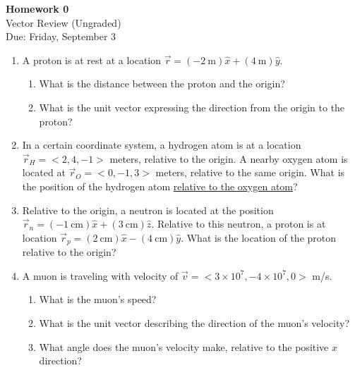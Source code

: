 \documentclass{article}
\begin{document}
\fancyfoot[C]{\thepage}
\vspace*{0cm}
\begin{center}
	{\LARGE \textbf{Homework 0}}\\
	\vspace{0.25cm}
	{\Large Vector Review (Ungraded)}\\
	\vspace{0.25cm}
	{\Large Due: Friday, September 3}
\end{center}

\begin{enumerate}
	\item A proton is at rest at a location $\vec{r}=(-2\ \mathrm{m})\hat{x} + (4\ \mathrm{m})\hat{y}$. 
	\begin{enumerate}
		\item What is the distance between the proton and the origin?
		\item What is the unit vector expressing the direction from the origin to the proton?
	\end{enumerate}

	\item In a certain coordinate system, a hydrogen atom is at a location $\vec{r}_H=<2,4,-1>$ meters, relative to the origin. A nearby oxygen atom is located at $\vec{r}_O=<0,-1,3>$ meters, relative to the same origin. What is the position of the hydrogen atom \underline{relative to the oxygen atom}?
	
	\item Relative to the origin, a neutron is located at the position $\vec{r}_n=(-1\ \mathrm{cm})\hat{x} + (3\ \mathrm{cm}) \hat{z}$. Relative to this neutron, a proton is at location $\vec{r}_p=(2\ \mathrm{cm})\hat{x} - (4\ \mathrm{cm})\hat{y}$. What is the location of the proton relative to the origin?
	
	\item A muon is traveling with velocity of $\vec{v}=<3\times10^7,-4\times10^7,0>$ m/s.
	\begin{enumerate}
		\item What is the muon's speed?
		\item What is the unit vector describing the direction of the muon's velocity?
		\item What angle does the muon's velocity make, relative to the positive $x$ direction?
	\end{enumerate}
\end{enumerate}
\end{document}
